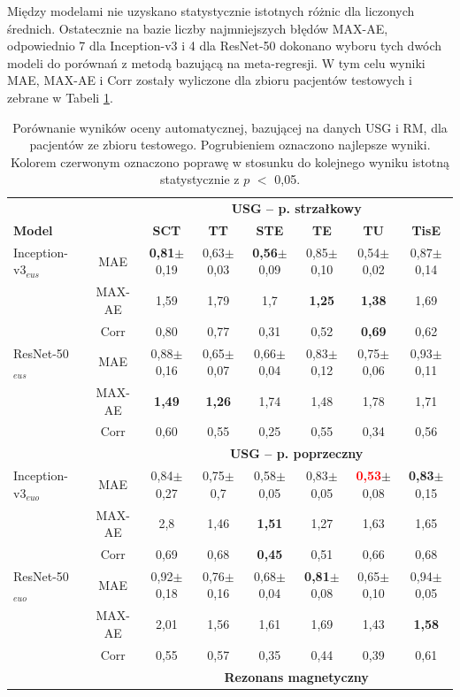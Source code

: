 Między modelami nie uzyskano statystycznie istotnych różnic  dla liczonych średnich. Ostatecznie na bazie liczby najmniejszych błędów MAX-AE, odpowiednio 7 dla Inception-v3 i 4 dla ResNet-50 dokonano wyboru tych dwóch modeli do porównań z metodą bazującą na meta-regresji. W tym celu wyniki MAE, MAX-AE i Corr zostały wyliczone dla zbioru pacjentów testowych i zebrane w Tabeli \ref{tab:USGvsRM-cross-validation}.
\vspace{6px}
\renewcommand{\arraystretch}{1.2}
\begin{table}[h]
	\scriptsize
	\setlength{\tabcolsep}{1pt}
	\centering
	\caption{Porównanie wyników oceny automatycznej, bazującej na danych USG i RM, dla pacjentów ze zbioru testowego. Pogrubieniem oznaczono najlepsze wyniki. Kolorem czerwonym oznaczono poprawę w stosunku do kolejnego wyniku istotną statystycznie z $p$ $<$ 0,05.}
	\label{tab:USGvsRM-cross-validation}
	\vspace{-0.5cm}
	\begin{tabular}{lc||c|c|c|c|c|c}
		& & \multicolumn{6}{c}{\textbf{USG -- p. strzałkowy}} \\
		\textbf{Model} & & \textbf{SCT} & \textbf{TT} & \textbf{STE} & \textbf{TE} & \textbf{TU} & \textbf{TisE} \\ \hline \hline
		Inception-v3$_{eus}$ & MAE & \textbf{0,81}$\pm$0,19 & 0,63$\pm$0,03 & \textbf{0,56}$\pm$0,09 & 0,85$\pm$0,10 & 0,54$\pm$0,02 & 0,87$\pm$0,14 \\
		& MAX-AE & 1,59 & 1,79 & 1,7 & \textbf{1,25} & \textbf{1,38} & 1,69 \\
		& Corr & 0,80 & 0,77 & 0,31 & 0,52 & \textbf{0,69} & 0,62 \\ \hline
		ResNet-50$_{eus}$ & MAE & 0,88$\pm$0,16 & 0,65$\pm$0,07 & 0,66$\pm$0,04 & 0,83$\pm$0,12 & 0,75$\pm$0,06 & 0,93$\pm$0,11 \\
		& MAX-AE & \textbf{1,49} & \textbf{1,26} & 1,74 & 1,48 & 1,78 & 1,71 \\
		& Corr & 0,60 & 0,55 & 0,25 & 0,55 & 0,34 & 0,56 \\
		\hline \hline
		& & \multicolumn{6}{c}{\textbf{USG -- p. poprzeczny}} \\
		
		Inception-v3$_{euo}$ & MAE & 0,84$\pm$0,27 & 0,75$\pm$0,7 & 0,58$\pm$0,05 & 0,83$\pm$0,05 & \textcolor{red}{\textbf{0,53}}$\pm$0,08 & \textbf{0,83}$\pm$0,15 \\
		& MAX-AE & 2,8 & 1,46 & \textbf{1,51} & 1,27 & 1,63 & 1,65 \\
		& Corr & 0,69 & 0,68 & \textbf{0,45} & 0,51 & 0,66 & 0,68 \\ \hline
		ResNet-50$_{euo}$ & MAE & 0,92$\pm$0,18 & 0,76$\pm$0,16 & 0,68$\pm$0,04 & \textbf{0,81}$\pm$0,08 & 0,65$\pm$0,10 & 0,94$\pm$0,05 \\
		& MAX-AE & 2,01 & 1,56 & 1,61 & 1,69& 1,43 & \textbf{1,58}\\
		& Corr & 0,55 & 0,57 & 0,35 & 0,44 & 0,39 & 0,61 \\ \hline \hline
		& & \multicolumn{6}{c}{\textbf{Rezonans magnetyczny}} \\
		

\end{tabular}
\end{table}
